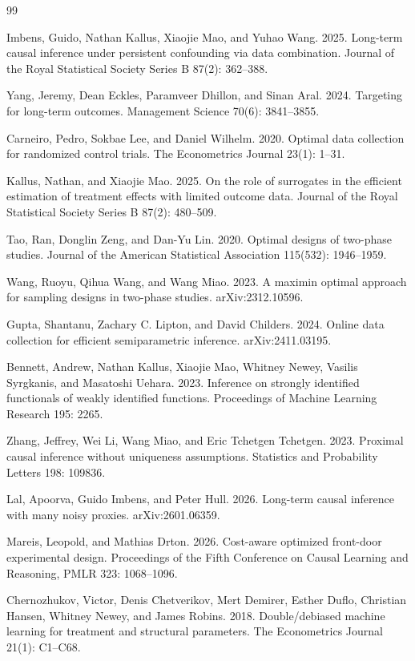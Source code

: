 \documentclass{article}
\begin{document}
\begin{thebibliography}{99}

   Imbens, Guido, Nathan Kallus, Xiaojie Mao, and Yuhao Wang. 2025. Long-term causal inference under persistent confounding via data combination. Journal of the Royal Statistical Society Series B 87(2): 362--388.

   Yang, Jeremy, Dean Eckles, Paramveer Dhillon, and Sinan Aral. 2024. Targeting for long-term outcomes. Management Science 70(6): 3841--3855.

   Carneiro, Pedro, Sokbae Lee, and Daniel Wilhelm. 2020. Optimal data collection for randomized control trials. The Econometrics Journal 23(1): 1--31.

   Kallus, Nathan, and Xiaojie Mao. 2025. On the role of surrogates in the efficient estimation of treatment effects with limited outcome data. Journal of the Royal Statistical Society Series B 87(2): 480--509.

   Tao, Ran, Donglin Zeng, and Dan-Yu Lin. 2020. Optimal designs of two-phase studies. Journal of the American Statistical Association 115(532): 1946--1959.

   Wang, Ruoyu, Qihua Wang, and Wang Miao. 2023. A maximin optimal approach for sampling designs in two-phase studies. arXiv:2312.10596.

   Gupta, Shantanu, Zachary C. Lipton, and David Childers. 2024. Online data collection for efficient semiparametric inference. arXiv:2411.03195.

   Bennett, Andrew, Nathan Kallus, Xiaojie Mao, Whitney Newey, Vasilis Syrgkanis, and Masatoshi Uehara. 2023. Inference on strongly identified functionals of weakly identified functions. Proceedings of Machine Learning Research 195: 2265.

   Zhang, Jeffrey, Wei Li, Wang Miao, and Eric Tchetgen Tchetgen. 2023. Proximal causal inference without uniqueness assumptions. Statistics and Probability Letters 198: 109836.

   Lal, Apoorva, Guido Imbens, and Peter Hull. 2026. Long-term causal inference with many noisy proxies. arXiv:2601.06359.

   Mareis, Leopold, and Mathias Drton. 2026. Cost-aware optimized front-door experimental design. Proceedings of the Fifth Conference on Causal Learning and Reasoning, PMLR 323: 1068--1096.

   Chernozhukov, Victor, Denis Chetverikov, Mert Demirer, Esther Duflo, Christian Hansen, Whitney Newey, and James Robins. 2018. Double/debiased machine learning for treatment and structural parameters. The Econometrics Journal 21(1): C1--C68.

\end{thebibliography}
\end{document}

